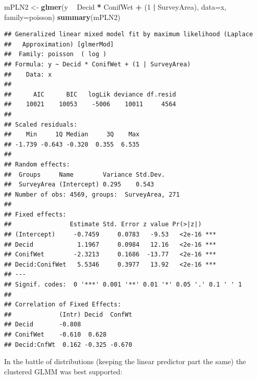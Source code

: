 \documentclass[12pt,]{book}
\newenvironment{Shaded}{\begin{snugshade}}{\end{snugshade}}
\newcommand{\DataTypeTok}[1]{\textcolor[rgb]{0.13,0.29,0.53}{#1}}
\newcommand{\DecValTok}[1]{\textcolor[rgb]{0.00,0.00,0.81}{#1}}
\newcommand{\KeywordTok}[1]{\textcolor[rgb]{0.13,0.29,0.53}{\textbf{#1}}}
\newcommand{\NormalTok}[1]{#1}
\newcommand{\OperatorTok}[1]{\textcolor[rgb]{0.81,0.36,0.00}{\textbf{#1}}}
\newcommand{\StringTok}[1]{\textcolor[rgb]{0.31,0.60,0.02}{#1}}
\begin{document}
\begin{Shaded}
\begin{Highlighting}[]
\NormalTok{mPLN2 <-}\StringTok{ }\KeywordTok{glmer}\NormalTok{(y }\OperatorTok{~}\StringTok{ }\NormalTok{Decid }\OperatorTok{*}\StringTok{ }\NormalTok{ConifWet }\OperatorTok{+}\StringTok{ }\NormalTok{(}\DecValTok{1} \OperatorTok{|}\StringTok{ }\NormalTok{SurveyArea), }\DataTypeTok{data=}\NormalTok{x, }\DataTypeTok{family=}\NormalTok{poisson)}
\KeywordTok{summary}\NormalTok{(mPLN2)}
\end{Highlighting}
\end{Shaded}

\begin{verbatim}
## Generalized linear mixed model fit by maximum likelihood (Laplace
##   Approximation) [glmerMod]
##  Family: poisson  ( log )
## Formula: y ~ Decid * ConifWet + (1 | SurveyArea)
##    Data: x
## 
##      AIC      BIC   logLik deviance df.resid 
##    10021    10053    -5006    10011     4564 
## 
## Scaled residuals: 
##    Min     1Q Median     3Q    Max 
## -1.739 -0.643 -0.320  0.355  6.535 
## 
## Random effects:
##  Groups     Name        Variance Std.Dev.
##  SurveyArea (Intercept) 0.295    0.543   
## Number of obs: 4569, groups:  SurveyArea, 271
## 
## Fixed effects:
##                Estimate Std. Error z value Pr(>|z|)    
## (Intercept)     -0.7459     0.0783   -9.53   <2e-16 ***
## Decid            1.1967     0.0984   12.16   <2e-16 ***
## ConifWet        -2.3213     0.1686  -13.77   <2e-16 ***
## Decid:ConifWet   5.5346     0.3977   13.92   <2e-16 ***
## ---
## Signif. codes:  0 '***' 0.001 '**' 0.01 '*' 0.05 '.' 0.1 ' ' 1
## 
## Correlation of Fixed Effects:
##             (Intr) Decid  ConfWt
## Decid       -0.808              
## ConifWet    -0.610  0.628       
## Decid:CnfWt  0.162 -0.325 -0.670
\end{verbatim}

In the battle of distributions (keeping the linear predictor
part the same) the clustered GLMM was best supported:

\begin{Shaded}
\end{Shaded}
\end{document}
